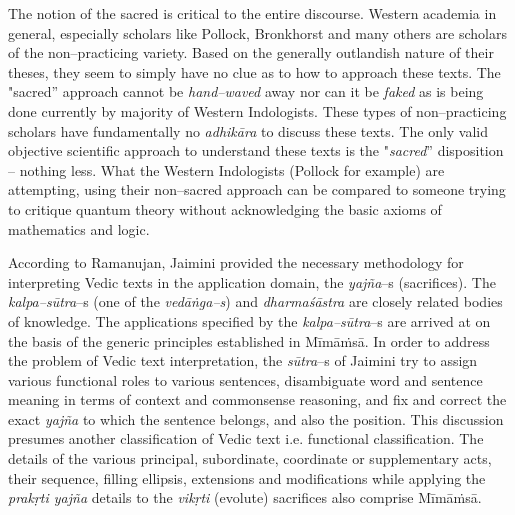The notion of the sacred is critical to the entire discourse. Western academia in general, especially scholars like Pollock, Bronkhorst and many others are scholars of the non–practicing variety. Based on the generally outlandish nature of their theses, they seem to simply have no clue as to how to approach these texts. The "sacred” approach cannot be \textit{hand–waved} away nor can it be \textit{faked} as is being done currently by majority of Western Indologists. These types of non–practicing scholars have fundamentally no \textit{adhikāra} to discuss these texts. The only valid objective scientific approach to understand these texts is the "\textit{sacred}” disposition – nothing less. What the Western Indologists (Pollock for example) are attempting, using their non–sacred approach can be compared to someone trying to critique quantum theory without acknowledging the basic axioms of mathematics and logic.

According to Ramanujan, Jaimini provided the necessary methodology for interpreting Vedic texts in the application domain, the \textit{yajña}–s (sacrifices). The \textit{kalpa–sūtra}–s (one of the \textit{vedāṅga–s}) and \textit{dharmaśāstra} are closely related bodies of knowledge. The applications specified by the \textit{kalpa–sūtra}–s are arrived at on the basis of the generic principles established in Mīmāṁsā. In order to address the problem of Vedic text interpretation, the \textit{sūtra}–s of Jaimini try to assign various functional roles to various sentences, disambiguate word and sentence meaning in terms of context and commonsense reasoning, and fix and correct the exact \textit{yajña} to which the sentence belongs, and also the position. This discussion presumes another classification of Vedic text i.e. functional classification. The details of the various principal, subordinate, coordinate or supplementary acts, their sequence, filling ellipsis, extensions and modifications while applying the \textit{prakṛti yajña} details to the \textit{vikṛti} (evolute) sacrifices also comprise Mīmāṁsā.

